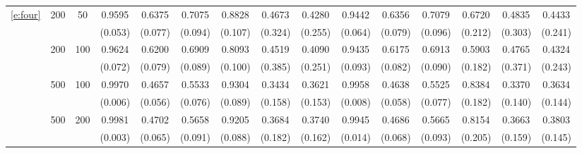 \begin{table}[htb!]
{\begin{tabular}{ccc cccccc cccccc}
\ref{e:four} & 200 & 50 & 0.9595 & 0.6375 & 0.7075 & 0.8828 & 0.4673 & 0.4280 & 0.9442 & 0.6356 & 0.7079 & 0.6720 & 0.4835 & 0.4433 \\
 &  &  & (0.053) & (0.077) & (0.094) & (0.107) & (0.324) & (0.255) & (0.064) & (0.079) & (0.096) & (0.212) & (0.303) & (0.241) \\
 & 200 & 100 & 0.9624 & 0.6200 & 0.6909 & 0.8093 & 0.4519 & 0.4090 & 0.9435 & 0.6175 & 0.6913 & 0.5903 & 0.4765 & 0.4324 \\
 &  &  & (0.072) & (0.079) & (0.089) & (0.100) & (0.385) & (0.251) & (0.093) & (0.082) & (0.090) & (0.182) & (0.371) & (0.243) \\
 & 500 & 100 & 0.9970 & 0.4657 & 0.5533 & 0.9304 & 0.3434 & 0.3621 & 0.9958 & 0.4638 & 0.5525 & 0.8384 & 0.3370 & 0.3634 \\
 &  &  & (0.006) & (0.056) & (0.076) & (0.089) & (0.158) & (0.153) & (0.008) & (0.058) & (0.077) & (0.182) & (0.140) & (0.144) \\
 & 500 & 200 & 0.9981 & 0.4702 & 0.5658 & 0.9205 & 0.3684 & 0.3740 & 0.9945 & 0.4686 & 0.5665 & 0.8154 & 0.3663 & 0.3803 \\
 &  &  & (0.003) & (0.065) & (0.091) & (0.088) & (0.182) & (0.162) & (0.014) & (0.068) & (0.093) & (0.205) & (0.159) & (0.145) \\ \bottomrule
\end{tabular} }
\end{table}

